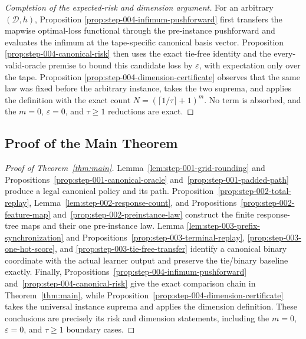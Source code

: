 \begin{proof}[Completion of the expected-risk and dimension argument]
For an arbitrary \((\mathcal D,h)\), Proposition
\ref{prop:step-004-infimum-pushforward} first transfers the mapwise
optimal-loss functional through the pre-instance pushforward and evaluates
the infimum at the tape-specific canonical basis vector.  Proposition
\ref{prop:step-004-canonical-risk} then uses the exact tie-free identity and
the every-valid-oracle premise to bound this candidate loss by
\(\varepsilon\), with expectation only over the tape.  Proposition
\ref{prop:step-004-dimension-certificate} observes that the same law was
fixed before the arbitrary instance, takes the two suprema, and applies the
definition with the exact count
\(N=(\lceil1/\tau\rceil+1)^m\).  No term is absorbed, and the
\(m=0\), \(\varepsilon=0\), and \(\tau\ge1\) reductions are exact.
\end{proof}

\subsection{Proof of the Main Theorem}\label{app:main-proof}

\begin{proof}[Proof of Theorem~\ref{thm:main}]
Lemma~\ref{lem:step-001-grid-rounding} and
Propositions~\ref{prop:step-001-canonical-oracle}
and~\ref{prop:step-001-padded-path} produce a legal canonical policy and its
path.  Proposition~\ref{prop:step-002-total-replay},
Lemma~\ref{lem:step-002-response-count}, and
Propositions~\ref{prop:step-002-feature-map}
and~\ref{prop:step-002-preinstance-law} construct the finite response-tree
maps and their one pre-instance law.  Lemma
\ref{lem:step-003-prefix-synchronization} and
Propositions~\ref{prop:step-003-terminal-replay},
\ref{prop:step-003-one-hot-score}, and
\ref{prop:step-003-tie-free-transfer} identify a canonical binary coordinate
with the actual learner output and preserve the tie/binary baseline exactly.
Finally, Propositions~\ref{prop:step-004-infimum-pushforward}
and~\ref{prop:step-004-canonical-risk} give the exact comparison chain in
Theorem~\ref{thm:main}, while
Proposition~\ref{prop:step-004-dimension-certificate} takes the universal
instance suprema and applies the dimension definition.  These conclusions
are precisely its risk and dimension statements, including the
\(m=0\), \(\varepsilon=0\), and \(\tau\ge1\) boundary cases.
\end{proof}

